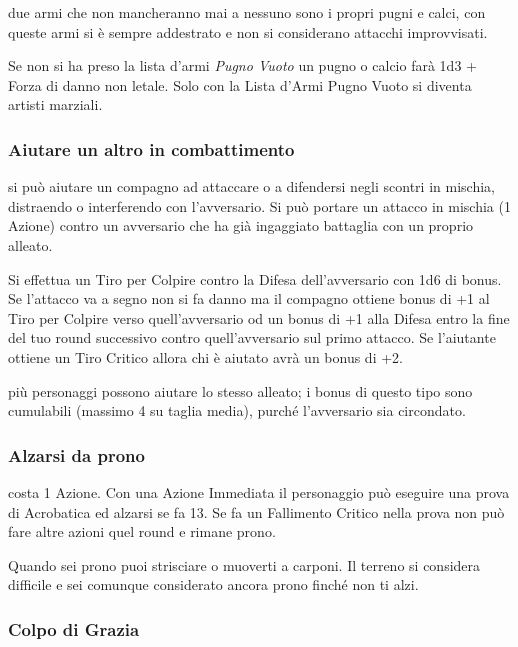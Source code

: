 \begin{multicols}{2}
due armi che non mancheranno mai a nessuno sono i propri pugni e calci, con queste armi si è sempre addestrato e non si considerano attacchi improvvisati.

Se non si ha preso la lista d'armi \emph{Pugno Vuoto} un pugno o calcio farà 1d3 + Forza di danno non letale. Solo con la Lista d'Armi Pugno Vuoto si diventa artisti marziali.

\subsubsection{Aiutare un altro in combattimento}\label{aiutare}\hypertarget{aiutare}{}

si può aiutare un compagno ad attaccare o a difendersi negli scontri in mischia, distraendo o interferendo con l'avversario. Si può portare un attacco in mischia (1 Azione) contro un avversario che ha già ingaggiato battaglia con un proprio alleato.

Si effettua un Tiro per Colpire contro la Difesa dell'avversario con 1d6 di bonus. Se l'attacco va a segno non si fa danno ma il compagno ottiene bonus di +1 al Tiro per Colpire verso quell'avversario od un bonus di +1 alla Difesa entro la fine del tuo round successivo contro quell'avversario sul primo attacco. Se l'aiutante ottiene un Tiro Critico allora chi è aiutato avrà un bonus di +2.

più personaggi possono aiutare lo stesso alleato; i bonus di questo tipo sono cumulabili (massimo 4 su taglia media), purché l'avversario sia circondato.

\subsubsection{Alzarsi da prono}\label{alzarsidaprono}\hypertarget{alzarsidaprono}{}

costa 1 Azione. Con una Azione Immediata il personaggio può eseguire una prova di Acrobatica ed alzarsi se fa 13. Se fa un Fallimento Critico nella prova non può fare altre azioni quel round e rimane prono.

Quando sei prono puoi strisciare o muoverti a carponi. Il terreno si considera difficile e sei comunque considerato ancora prono finché non ti alzi.

\subsubsection{Colpo di Grazia} \label{colpodigrazia}


\end{multicols}
